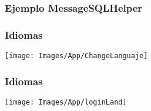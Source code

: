 
\begin{frame}
	\frametitle{Ejemplo {\ttfamily MessageSQLHelper}}
	
\end{frame}


\begin{frame}
	\frametitle{Idiomas}
	\begin{center}
		\texttt{[image: Images/App/ChangeLanguaje]}
	\end{center}
\end{frame}


\begin{frame}
	\frametitle{Idiomas}
	
\end{frame}


\begin{frame}
	\begin{center}
		\texttt{[image: Images/App/loginLand]}
	\end{center}
\end{frame}